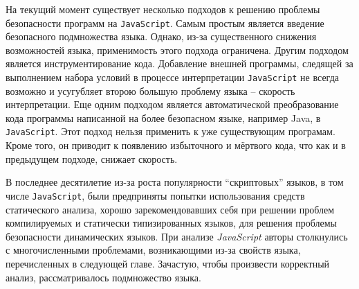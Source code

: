 На текущий момент существует несколько подходов к решению проблемы
безопасности программ на \texttt{JavaScript}. Самым простым является
введение безопасного подмножества языка. Однако, из-за существенного
снижения возможностей языка, применимость этого подхода ограничена.
Другим подходом является инструментирование кода.  Добавление внешней
программы, следящей за выполнением набора условий в процессе
интерпретации \texttt{JavaScript} не всегда возможно и усугубляет
второю большую проблему языка -- скорость интерпретации. Еще одним
подходом является автоматической преобразование кода программы
написанной на более безопасном языке, например Java, в
\texttt{JavaScript}. Этот подход нельзя применить к уже существующим
програмам. Кроме того, он приводит к появлению избыточного и мёртвого
кода, что как и в предыдущем подходе, снижает скорость. 

В последнее десятилетие из-за роста популярности ``скриптовых''
языков, в том числе \texttt{JavaScript}, были предприняты попытки
использования средств статического анализа, хорошо зарекомендовавших
себя при решении проблем компилируемых и статически типизированных
языков, для решения проблемы безопасности динамических языков. 
При анализе \emph{JavaScript} авторы столкнулись с многочисленными
проблемами, возникающими из-за свойств языка, перечисленных в
следующей главе. Зачастую, чтобы произвести корректный анализ,
рассматривалось подмножество языка.

